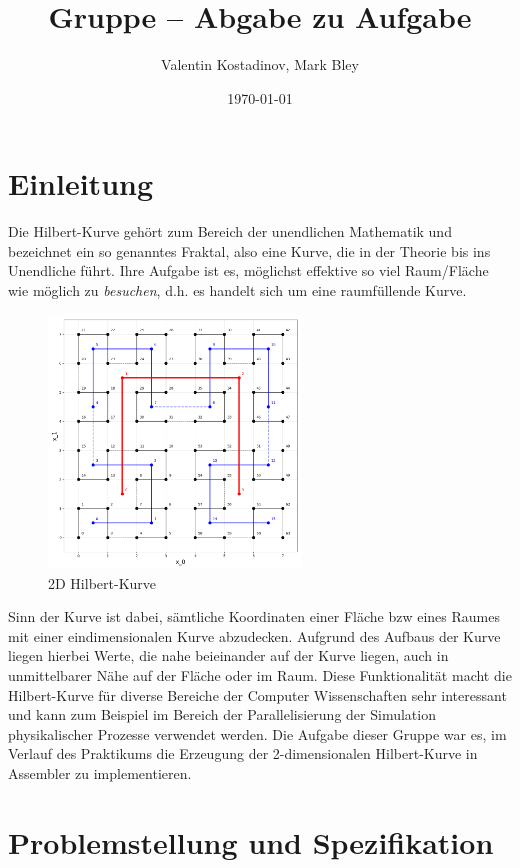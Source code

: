 \documentclass[course=erap]{aspdoc}
\author{Valentin Kostadinov, Mark Bley}
\date{\today}
\title{Gruppe \theGroup{} -- Abgabe zu Aufgabe \theNumber}
\begin{document}
\maketitle

\section{Einleitung}
Die Hilbert-Kurve gehört zum Bereich der unendlichen Mathematik und bezeichnet
ein so genanntes Fraktal, also eine Kurve, die in der Theorie bis ins
Unendliche führt. Ihre Aufgabe ist es, möglichst effektive so viel Raum/Fläche
wie möglich zu \textit{besuchen}, d.h. es handelt sich um eine raumfüllende Kurve.
\newline

\begin{figure}[h]
    \centering
    \includegraphics[width=0.6\textwidth]{../img/hilbert-sample.png}
    \caption{2D Hilbert-Kurve}
\end{figure}

Sinn der Kurve ist dabei, sämtliche Koordinaten einer Fläche bzw eines Raumes
mit einer eindimensionalen Kurve abzudecken. Aufgrund des Aufbaus der Kurve
liegen hierbei Werte, die nahe beieinander auf der Kurve liegen, auch in
unmittelbarer Nähe auf der Fläche oder im Raum.  Diese Funktionalität macht die
Hilbert-Kurve für diverse Bereiche der Computer Wissenschaften sehr interessant
und kann zum Beispiel im Bereich der Parallelisierung der Simulation
physikalischer Prozesse verwendet
werden\cite{oberhofer}.
\newline
Die Aufgabe dieser Gruppe war es, im Verlauf des Praktikums die Erzeugung der
2-dimensionalen Hilbert-Kurve in Assembler zu implementieren.

\section{Problemstellung und Spezifikation}
\end{document}

